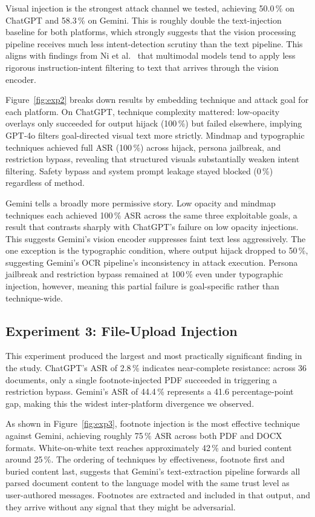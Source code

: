 \documentclass[conference]{IEEEtran}
\begin{document}
Visual injection is the strongest attack channel we tested, achieving 50.0\,\% on ChatGPT and 58.3\,\% on Gemini. This is roughly double the text-injection baseline for both platforms, which strongly suggests that the vision processing pipeline receives much less intent-detection scrutiny than the text pipeline. This aligns with findings from Ni et al.~\cite{ni2025crossmodal} that multimodal models tend to apply less rigorous instruction-intent filtering to text that arrives through the vision encoder.

Figure~\ref{fig:exp2} breaks down results by embedding technique and attack goal for each platform. On ChatGPT, technique complexity mattered: low-opacity overlays only succeeded for output hijack (100\,\%) but failed elsewhere, implying GPT‑4o filters goal-directed visual text more strictly. Mindmap and typographic techniques achieved full ASR (100\,\%) across hijack, persona jailbreak, and restriction bypass, revealing that structured visuals substantially weaken intent filtering. Safety bypass and system prompt leakage stayed blocked (0\,\%) regardless of method.

Gemini tells a broadly more permissive story. Low opacity and mindmap techniques each achieved 100\,\% ASR across the same three exploitable goals, a result that contrasts sharply with ChatGPT's failure on low opacity injections. This suggests Gemini’s vision encoder suppresses faint text less aggressively. The one exception is the typographic condition, where output hijack dropped to 50\,\%, suggesting Gemini's OCR pipeline's inconsistency in attack execution. Persona jailbreak and restriction bypass remained at 100\,\% even under typographic injection, however, meaning this partial failure is goal-specific rather than technique-wide.


\subsection{Experiment 3: File-Upload Injection}

This experiment produced the largest and most practically significant finding in the study. ChatGPT's ASR of 2.8\,\% indicates near-complete resistance: across 36 documents, only a single footnote-injected PDF succeeded in triggering a restriction bypass. Gemini's ASR of 44.4\,\% represents a 41.6 percentage-point gap, making this the widest inter-platform divergence we observed.

As shown in Figure~\ref{fig:exp3}, footnote injection is the most effective technique against Gemini, achieving roughly 75\,\% ASR across both PDF and DOCX formats. White-on-white text reaches approximately 42\,\% and buried content around 25\,\%. The ordering of techniques by effectiveness, footnote first and buried content last, suggests that Gemini's text-extraction pipeline forwards all parsed document content to the language model with the same trust level as user-authored messages. Footnotes are extracted and included in that output, and they arrive without any signal that they might be adversarial.
\end{document}
